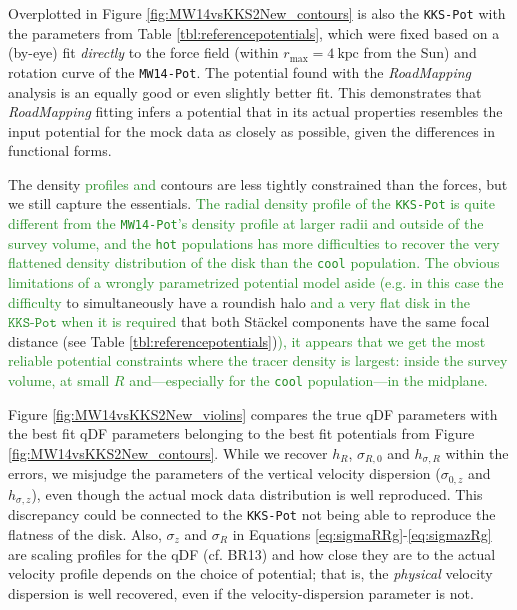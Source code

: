 \documentclass[iop,revtex4]{emulateapj}
\newcommand{\RM}{{\sl RoadMapping}}
\newcommand{\NEW}[1]{\textcolor{ForestGreen}{#1}}
\newcommand{\OLD}[1]{}
\begin{document}
Overplotted in Figure \ref{fig:MW14vsKKS2New_contours} is also the \texttt{KKS-Pot} with the parameters from Table \ref{tbl:referencepotentials}, which were fixed based on a (by-eye) fit \emph{directly} to the force field (within $r_\text{max}=4~\text{kpc}$ from the Sun) and rotation curve of the \texttt{MW14-Pot}. The potential found with the \RM{} analysis is an equally good or even slightly better fit. This demonstrates that \RM{} fitting infers a potential that in its actual properties resembles the input potential for the mock data as closely as possible, given the differences in functional forms.

The density \NEW{profiles and} contours are less tightly constrained than the forces, but we still capture the essentials. \NEW{The radial density profile of the \texttt{KKS-Pot} is quite different from the \texttt{MW14-Pot}'s density profile at larger radii and outside of the survey volume, and the \texttt{hot} populations has more difficulties to recover the very flattened density distribution of the disk than the \texttt{cool} population. The obvious limitations of a wrongly parametrized potential model aside (e.g. in this case the difficulty} to simultaneously have a roundish halo \NEW{and a very flat disk in the $\texttt{KKS-Pot}$ when it is required} that both St\"{a}ckel components have the same focal distance (see Table \ref{tbl:referencepotentials})\NEW{), it appears that we get the most reliable potential constraints where the tracer density is largest: inside the survey volume, at small $R$ and---especially for the \texttt{cool} population---in the midplane.}
\OLD{Overall the best fit disk is less dense in the mid-plane than the true disk. While it is in general possible to generate very flattened density distributions from St\"{a}ckel potentials, it might be difficult to simultaneously have a roundish halo and to require that both St\"{a}ckel components have the same focal distance (see Table \ref{tbl:referencepotentials}).}

Figure \ref{fig:MW14vsKKS2New_violins} compares the true qDF parameters with the best fit qDF parameters belonging to the best fit potentials from Figure \ref{fig:MW14vsKKS2New_contours}. While we recover $h_R$, $\sigma_{R,0}$ and $h_{\sigma,R}$ within the errors, we misjudge the parameters of the vertical velocity dispersion ($\sigma_{0,z}$ and $h_{\sigma,z}$), even though the actual mock data distribution is well reproduced. This discrepancy could be connected to the \texttt{KKS-Pot} not being able to reproduce the flatness of the disk. Also, $\sigma_z$ and $\sigma_R$ in Equations \eqref{eq:sigmaRRg}-\eqref{eq:sigmazRg} are scaling profiles for the qDF (cf. BR13) and how close they are to the actual velocity profile depends on the choice of potential; that is, the \emph{physical} velocity dispersion is well recovered, even if the velocity-dispersion parameter is not.
\end{document}
